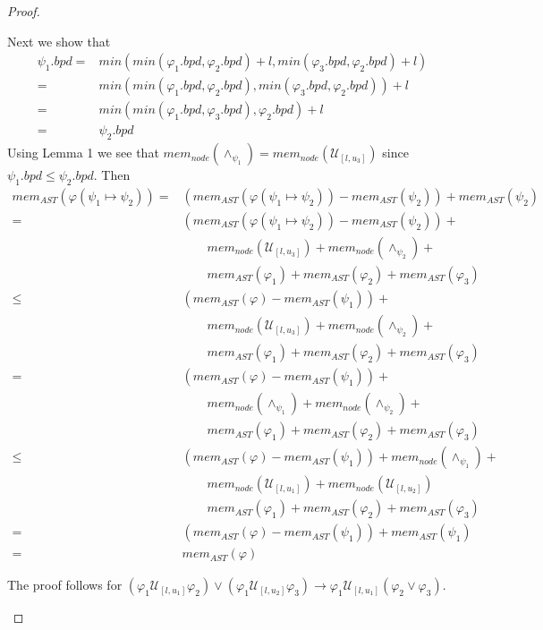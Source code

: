 \documentclass{article}
\begin{document}
\begin{proof}
\begin{enumerate}
Next we show that 
\begin{align*}
\psi_1.bpd = & min(min(\varphi_1.bpd,\varphi_2.bpd) + l, min(\varphi_3.bpd,\varphi_2.bpd) + l) \\
= & min(min(\varphi_1.bpd,\varphi_2.bpd) , min(\varphi_3.bpd,\varphi_2.bpd)) + l \\
= & min(min(\varphi_1.bpd,\varphi_3.bpd),\varphi_2.bpd) + l \\
= & \psi_2.bpd
\end{align*}
Using Lemma 1 we see that $mem_{node}(\land_{\psi_1}) = mem_{node}(\mathcal{U}_{[l,u_3]}{})$ since $\psi_1.bpd \leq \psi_2.bpd$. Then
\begin{align*}
mem_{AST}(\varphi(\psi_1 \mapsto \psi_2)) = & (mem_{AST}(\varphi(\psi_1 \mapsto \psi_2)) - mem_{AST}(\psi_2)) + mem_{AST}(\psi_2) \\
= & (mem_{AST}(\varphi(\psi_1 \mapsto \psi_2)) - mem_{AST}(\psi_2)) + \\
&  \qquad mem_{node}(\mathcal{U}_{[l,u_3]}{}) + mem_{node}(\land_{\psi_2}) + \\
&  \qquad mem_{AST}(\varphi_1) + mem_{AST}(\varphi_2) + mem_{AST}(\varphi_3)  \\
\leq & (mem_{AST}(\varphi) - mem_{AST}(\psi_1)) + \\
&  \qquad mem_{node}(\mathcal{U}_{[l,u_3]}{}) + mem_{node}(\land_{\psi_2}) + \\
&  \qquad mem_{AST}(\varphi_1) + mem_{AST}(\varphi_2) + mem_{AST}(\varphi_3)  \\
= & (mem_{AST}(\varphi) - mem_{AST}(\psi_1)) + \\
&  \qquad mem_{node}(\land_{\psi_1}) + mem_{node}(\land_{\psi_2}) + \\
&  \qquad mem_{AST}(\varphi_1) + mem_{AST}(\varphi_2) + mem_{AST}(\varphi_3)  \\
\leq & (mem_{AST}(\varphi) - mem_{AST}(\psi_1)) + mem_{node}(\land_{\psi_1}) + \\
&  \qquad mem_{node}(\mathcal{U}_{[l,u_1]}{}) + mem_{node}(\mathcal{U}_{[l,u_2]}{}) \\
&  \qquad mem_{AST}(\varphi_1) + mem_{AST}(\varphi_2) + mem_{AST}(\varphi_3)  \\
= & (mem_{AST}(\varphi) - mem_{AST}(\psi_1)) + mem_{AST}(\psi_1) \\
= & mem_{AST}(\varphi)
\end{align*}

The proof follows for $({\varphi_1}\mathcal{U}_{[l,u_1]}{\varphi_2}) \lor ({\varphi_1}\mathcal{U}_{[l,u_2]}{\varphi_3}) \rightarrow {\varphi_1}\mathcal{U}_{[l,u_1]}{(\varphi_2 \lor \varphi_3)}$. 


\end{enumerate}
\end{proof}
\end{document}
